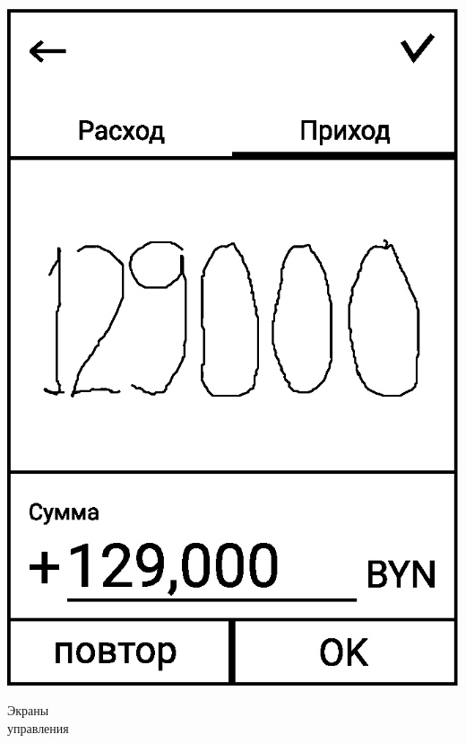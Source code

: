 \documentclass[russian,utf8,a1paper,nostitching,simple]{eskdgraph}
\begin{document}
\begin{ESKDdrawing}
\begin{minipage}{17cm}
\begin{minipage}{7.5cm}
      \vspace{2cm}
      \centering
      \includegraphics[width=\linewidth]{fig/ui_activities_input_income_graphic.eps}
    \end{minipage}
  \end{minipage}
  \hfill
  \begin{minipage}{28cm}
    \centering
    {\fontsize{40}{50}\selectfont Экраны \\ управления}

    \vspace{2cm}
    \begin{minipage}{7.5cm}
      \centering


\end{minipage}
\end{minipage}
\end{ESKDdrawing}
\end{document}
